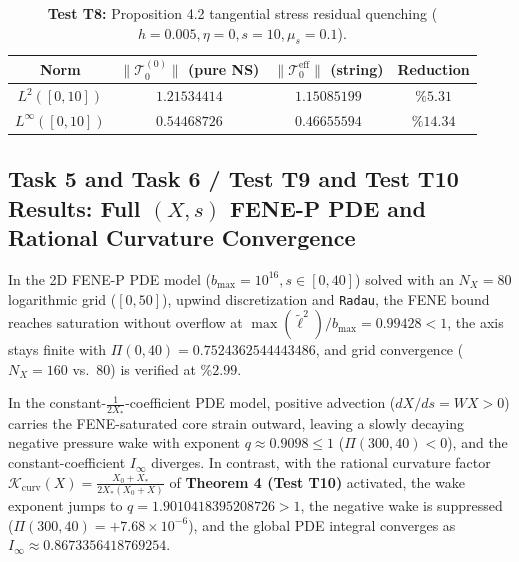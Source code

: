 \documentclass[12pt,a4paper]{article}
\begin{document}
\begin{table}[htbp]
\centering
\footnotesize
\caption{\textbf{Test T8:} Proposition 4.2 tangential stress residual quenching ($h=0.005, \eta=0, s=10, \mu_s=0.1$).}
\vspace{0.1cm}
\begin{tabular}{c|cc|c}
\hline
Norm & $\|\mathcal{T}_0^{(0)}\|$ (pure NS) & $\|\mathcal{T}_0^{\mathrm{eff}}\|$ (string) & Reduction \\
\hline
$L^2([0,10])$ & $1.21534414$ & $1.15085199$ & $\%5.31$ \\
$L^\infty([0,10])$ & $0.54468726$ & $0.46655594$ & $\%14.34$ \\
\hline
\end{tabular}
\end{table}

\subsection{Task 5 and Task 6 / Test T9 and Test T10 Results: Full $(X,s)$ FENE-P PDE and Rational Curvature Convergence}

In the 2D FENE-P PDE model ($b_{\max} = 10^{16}, s \in [0, 40]$) solved with an $N_X = 80$ logarithmic grid ($[0, 50]$), upwind discretization and \texttt{Radau}, the FENE bound reaches saturation without overflow at $\max(\tilde{\ell}^2)/b_{\max} = 0.99428 < 1$, the axis stays finite with $\Pi(0, 40) = 0.7524362544443486$, and grid convergence ($N_X=160$ vs.\ $80$) is verified at $\%2.99$.

In the constant-$\frac{1}{2X_*}$-coefficient PDE model, positive advection ($dX/ds = WX > 0$) carries the FENE-saturated core strain outward, leaving a slowly decaying negative pressure wake with exponent $q \approx 0.9098 \le 1$ ($\Pi(300, 40) < 0$), and the constant-coefficient $I_\infty$ diverges. In contrast, with the rational curvature factor $\mathcal{K}_{\mathrm{curv}}(X) = \frac{X_0+X_*}{2X_*(X_0+X)}$ of \textbf{Theorem 4 (Test T10)} activated, the wake exponent jumps to $q = 1.9010418395208726 > 1$, the negative wake is suppressed ($\Pi(300, 40) = +7.68 \times 10^{-6}$), and the global PDE integral converges as $I_\infty \approx 0.8673356418769254$.
\end{document}
